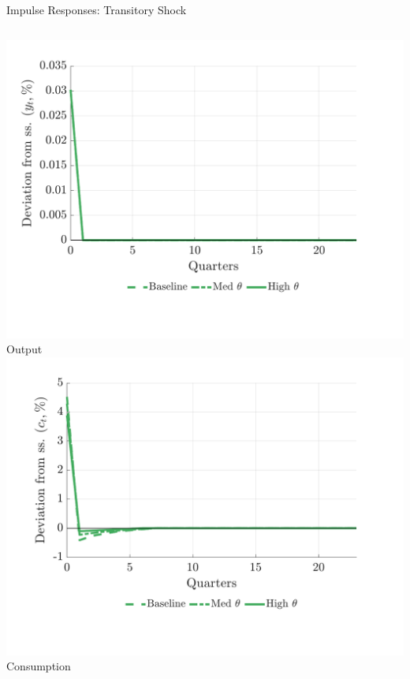 \documentclass[aspectratio=169,11pt,professionalfonts]{beamer}
\newcommand{\1}{\mathbb{1}}
\begin{document}
\begin{frame}{Impulse Responses: Transitory Shock}
  \begin{columns}[T,onlytextwidth]
    \includegraphics[width=\linewidth]{../../pro-default-model/results/comparison_figure_13.pdf}\\[-0.5em]
    {\scriptsize Output}
    \includegraphics[width=\linewidth]{../../pro-default-model/results/comparison_figure_15.pdf}\\[-0.5em]
    {\scriptsize Consumption}

\end{columns}
\end{frame}
\end{document}
